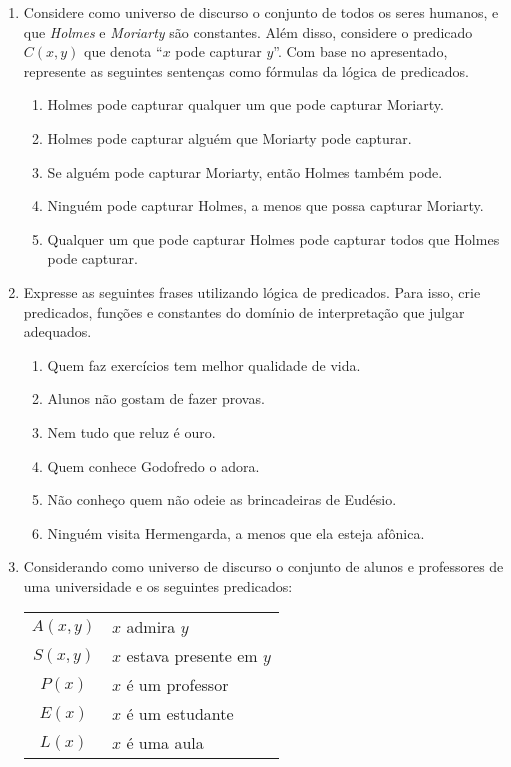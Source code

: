 \begin{enumerate}
  \item Considere como universo de discurso o conjunto de todos os
    seres humanos, e que \textit{Holmes} e \textit{Moriarty} são
    constantes. Além disso, considere o predicado $C(x,y)$ que denota
    ``$x$ pode capturar $y$''. Com base no apresentado, represente as
    seguintes sentenças como fórmulas da lógica de predicados.
    \begin{enumerate}
      \item Holmes pode capturar qualquer um que pode capturar Moriarty.
      \item Holmes pode capturar alguém que Moriarty pode capturar.
      \item Se alguém pode capturar Moriarty, então Holmes também
        pode.
      \item Ninguém pode capturar Holmes, a menos que possa capturar
        Moriarty.
      \item Qualquer um que pode capturar Holmes pode capturar todos
        que Holmes pode capturar.
    \end{enumerate}
    \item Expresse as seguintes frases utilizando l\'ogica de predicados.
	      Para isso, crie predicados, fun\c{c}\~oes e constantes do dom\'inio
	      de interpreta\c{c}\~ao que julgar adequados.
	\begin{enumerate}
		\item Quem faz exerc\'icios tem melhor qualidade de vida.
		\item Alunos n\~ao gostam de fazer provas.
		\item Nem tudo que reluz \'e ouro.
		\item Quem conhece Godofredo o adora.
		\item N\~ao conhe\c{c}o quem n\~ao odeie as brincadeiras de Eud\'esio.
		\item Ningu\'em visita Hermengarda, a menos que ela esteja af\^onica.
	\end{enumerate}
    \item Considerando como universo de discurso o conjunto de alunos
      e professores de uma universidade e os seguintes predicados:

      \begin{table}[h]
           \begin{tabular}{|c|l|}
             \hline
             $A(x,y)$ & $x$ admira $y$\\
             $S(x,y)$ & $x$ estava presente em $y$\\
             $P(x)$    & $x$ é um professor\\
             $E(x)$    & $x$ é um estudante \\
             $L(x)$    &  $x$ é uma aula \\ \hline
           \end{tabular}
           \centering
      \end{table}


\end{enumerate}
